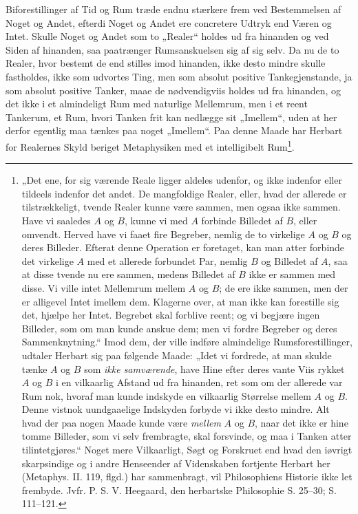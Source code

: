 \documentclass[11pt]{book}
\begin{document}
Biforestillinger af Tid og Rum træde endnu stærkere frem ved
Bestemmelsen af Noget og Andet, efterdi Noget og Andet ere concretere
Udtryk end Væren og Intet. Skulle Noget og Andet som to „Realer“
holdes ud fra hinanden og ved Siden af hinanden, saa paatrænger
Rumsanskuelsen sig af sig selv. Da nu de to Realer, hvor bestemt de
end stilles imod hinanden, ikke desto mindre skulle fastholdes, ikke
som udvortes Ting, men som absolut positive Tankegjenstande, ja som
absolut positive Tanker, maae de nødvendigviis holdes ud fra
hinanden, og det ikke i et almindeligt Rum med naturlige Mellemrum,
men i et reent Tankerum, et Rum, hvori Tanken frit kan nedlægge sit
„Imellem“, uden at her derfor egentlig maa tænkes paa noget
„Imellem“. Paa denne Maade har Herbart for Realernes Skyld beriget
Metaphysiken med et intelligibelt Rum\footnote{„Det ene, for sig
værende Reale ligger aldeles udenfor, og ikke indenfor eller tildeels
indenfor det andet. De mangfoldige Realer, eller, hvad der allerede
er tilstrækkeligt, tvende Realer kunne være sammen, men ogsaa ikke
sammen. Have vi saaledes $A$ og $B$, kunne vi med $A$ forbinde
Billedet af $B$, eller omvendt. Herved have vi faaet fire Begreber,
nemlig de to virkelige $A$ og $B$ og deres Billeder. Efterat denne
Operation er foretaget, kan man atter forbinde det virkelige $A$ med
et allerede forbundet Par, nemlig $B$ og Billedet af $A$, saa at
disse tvende nu ere sammen, medens Billedet af $B$ ikke er sammen med
disse. Vi ville intet Mellemrum mellem $A$ og $B$; de ere ikke
sammen, men der er alligevel Intet imellem dem. Klagerne over, at man
ikke kan forestille sig det, hjælpe her Intet. Begrebet skal forblive
reent; og vi begjære ingen Billeder, som om man kunde anskue dem; men
vi fordre Begreber og deres Sammenknytning.“ Imod dem, der ville
indføre almindelige Rumsforestillinger, udtaler Herbart sig paa
følgende Maade: „Idet vi fordrede, at man skulde tænke $A$ og $B$ som
\emph{ikke samværende}, have Hine efter deres vante Viis rykket $A$
og $B$ i en vilkaarlig Afstand ud fra hinanden, ret som om der
allerede var Rum nok, hvoraf man kunde indskyde en vilkaarlig
Størrelse mellem $A$ og $B$. Denne vistnok uundgaaelige Indskyden
forbyde vi ikke desto mindre. Alt hvad der paa nogen Maade kunde være
\emph{mellem} $A$ og $B$, naar det ikke er hine tomme Billeder, som
vi selv frembragte, skal forsvinde, og maa i Tanken atter
tilintetgjøres.“ Noget mere Vilkaarligt, Søgt og Forskruet end hvad
den iøvrigt skarpsindige og i andre Henseender af Videnskaben
fortjente Herbart her (Metaphys. II. 119, flgd.) har sammenbragt, vil
Philosophiens Historie ikke let frembyde. Jvfr. P. S. V. Heegaard,
den herbartske Philosophie S. 25--30; S. 111--121.}.
\end{document}
